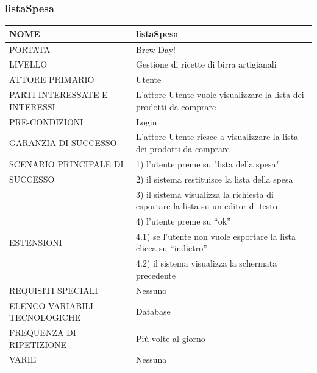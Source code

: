 \documentclass[a4paper, titlepage]{article}
\begin{document}
\subsubsection{listaSpesa}
\begin{longtable}{p{6cm}p{7cm}}\toprule
    NOME & listaSpesa\\\midrule
    PORTATA & Brew Day!\\\midrule
    LIVELLO & Gestione di ricette di birra artigianali\\\midrule
    ATTORE PRIMARIO & Utente\\\midrule
    PARTI INTERESSATE E INTERESSI & L’attore Utente vuole visualizzare la lista dei prodotti da comprare\\\midrule
    PRE-CONDIZIONI & Login\\\midrule
    GARANZIA DI SUCCESSO & L’attore Utente riesce a  visualizzare la lista dei prodotti da comprare\\\midrule
    SCENARIO PRINCIPALE DI
    & 1) l'utente preme su "lista della spesa"\\
    SUCCESSO & 2) il sistema restituisce la lista della spesa\\
    & 3) il sistema visualizza la richiesta di esportare la lista su un editor di testo\\
    & 4) l’utente preme su “ok”\\\midrule
    ESTENSIONI
    & 4.1) se l’utente non vuole esportare la lista clicca su “indietro”\\
    & 4.2) il sistema visualizza la schermata precedente\\\midrule
    REQUISITI SPECIALI & Nessuno\\\midrule
    ELENCO VARIABILI TECNOLOGICHE & Database\\\midrule
    FREQUENZA DI RIPETIZIONE & Più volte al giorno\\\midrule
    VARIE & Nessuna\\\bottomrule
\end{longtable}
\vphantom{}
\newpage
\end{document}
